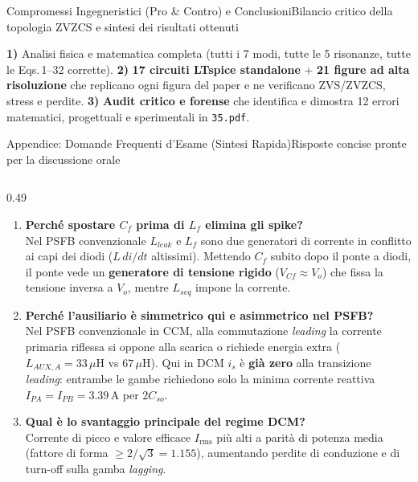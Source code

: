 \documentclass[aspectratio=169,9pt]{beamer}
\newcommand{\A}{\,\text{A}}
\newcommand{\uH}{\,\mu\text{H}}
\begin{document}
\begin{frame}{Compromessi Ingegneristici (Pro \& Contro) e Conclusioni}{Bilancio critico della topologia ZVZCS e sintesi dei risultati ottenuti}
  \vspace*{2mm}
  \begin{formulabox}[title={Sintesi del Progetto Realizzato}]
    \textbf{1)} Analisi fisica e matematica completa (tutti i 7 modi, tutte le 5 risonanze, tutte le Eqs.\,1--32 corrette).\quad
    \textbf{2)} \textbf{17 circuiti LTspice standalone} + \textbf{21 figure ad alta risoluzione} che replicano ogni figura del paper e ne verificano ZVS/ZVZCS, stress e perdite.\quad
    \textbf{3)} \textbf{Audit critico e forense} che identifica e dimostra 12 errori matematici, progettuali e sperimentali in \texttt{35.pdf}.
  \end{formulabox}
\end{frame}

\begin{frame}{Appendice: Domande Frequenti d'Esame (Sintesi Rapida)}{Risposte concise pronte per la discussione orale}
  \begin{columns}[T,onlytextwidth]
    \begin{column}{0.49\textwidth}
      \scriptsize
      \begin{enumerate}\setlength{\itemsep}{3.5pt}
        \item \textbf{\color{PrimaryBlue}Perch\'e spostare $C_f$ prima di $L_f$ elimina gli spike?}\\
              Nel PSFB convenzionale $L_{leak}$ e $L_f$ sono due generatori di corrente in conflitto ai capi dei diodi ($L\,di/dt$ altissimi). Mettendo $C_f$ subito dopo il ponte a diodi, il ponte vede un \textbf{generatore di tensione rigido} ($V_{Cf}\approx V_o$) che fissa la tensione inversa a $V_o$, mentre $L_{seq}$ impone la corrente.
        \item \textbf{\color{PrimaryBlue}Perch\'e l'ausiliario \`e simmetrico qui e asimmetrico nel PSFB?}\\
              Nel PSFB convenzionale in CCM, alla commutazione \emph{leading} la corrente primaria riflessa si oppone alla scarica o richiede energia extra ($L_{AUX,A}=33\uH$ vs $67\uH$). Qui in DCM $i_s$ \`e \textbf{gi\`a zero} alla transizione \emph{leading}: entrambe le gambe richiedono solo la minima corrente reattiva $I_{PA}=I_{PB}=3.39\A$ per $2C_{so}$.
        \item \textbf{\color{PrimaryBlue}Qual \`e lo svantaggio principale del regime DCM?}\\
              Corrente di picco e valore efficace $I_{\text{rms}}$ pi\`u alti a parit\`a di potenza media (fattore di forma $\ge 2/\sqrt{3}=1.155$), aumentando perdite di conduzione e di turn-off sulla gamba \emph{lagging}.

\end{enumerate}
\end{column}
\end{columns}
\end{frame}
\end{document}
